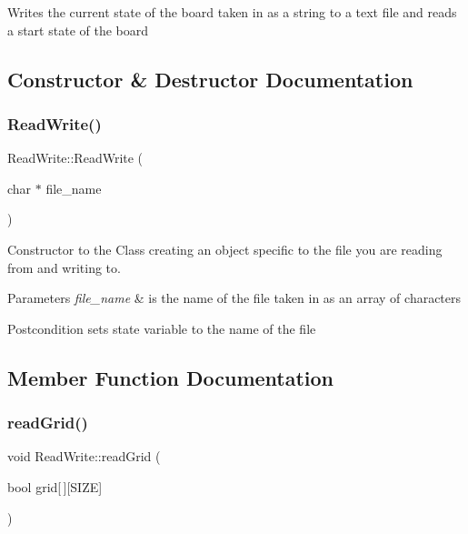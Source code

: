 Writes the current state of the board taken in as a string to a text file and reads a start state of the board 

\subsection{Constructor \& Destructor Documentation}
\mbox{\label{class_read_write_a09a19526aaaf1fe51d40cc6373215141}} 
\subsubsection{\texorpdfstring{ReadWrite()}{ReadWrite()}}
{\footnotesize\ttfamily Read\+Write\+::\+Read\+Write (\begin{DoxyParamCaption}\item[{char $\ast$}]{file\+\_\+name }\end{DoxyParamCaption})}



Constructor to the Class creating an object specific to the file you are reading from and writing to. 


\begin{DoxyParams}{Parameters}
{\em file\+\_\+name} & is the name of the file taken in as an array of characters \\
\hline
\end{DoxyParams}
\begin{DoxyPostcond}{Postcondition}
sets state variable to the name of the file 
\end{DoxyPostcond}


\subsection{Member Function Documentation}
\mbox{\label{class_read_write_aa254bc718dc3e9f29b314a305f2eee3f}} 
\subsubsection{\texorpdfstring{readGrid()}{readGrid()}}
{\footnotesize\ttfamily void Read\+Write\+::read\+Grid (\begin{DoxyParamCaption}\item[{bool}]{grid\mbox{[}$\,$\mbox{]}\mbox{[}\+S\+I\+Z\+E\mbox{]} }\end{DoxyParamCaption})}




